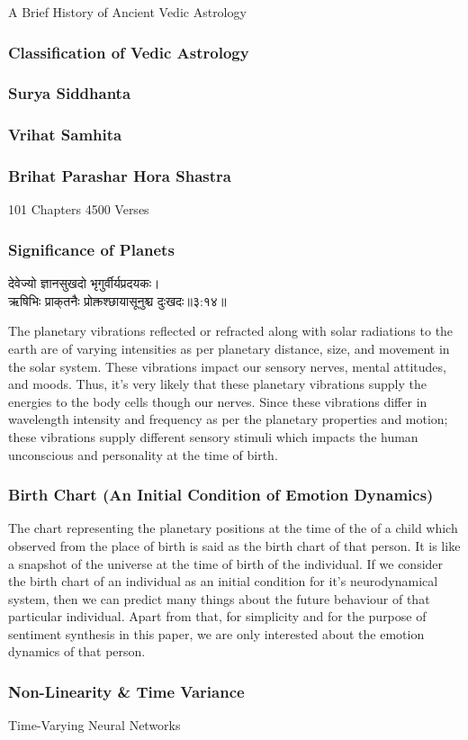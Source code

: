 A Brief History of Ancient Vedic Astrology
\subsubsection{Classification of Vedic Astrology}
\subsubsection{Surya Siddhanta}
\subsubsection{Vrihat Samhita}
\subsubsection{Brihat Parashar Hora Shastra}
101 Chapters
4500 Verses
\subsubsection{Significance of Planets}
\begin{sanskrit}
	\begin{center}
		देवेज्यो ज्ञानसुखदो भृगुर्वीर्यप्रदयकः।\\ऋषिभिः प्राक्‌तनैः प्रोक्तश्छायासूनुश्च दुःखदः॥३:१४॥\cite{BrihatParasharHoraShastraVol1}
	\end{center}
\end{sanskrit}
The planetary vibrations reflected or refracted along with solar radiations to the earth are of
varying intensities as per planetary distance, size, and movement in the solar system. These
vibrations impact our sensory nerves, mental attitudes, and moods. Thus, it’s very likely that
these planetary vibrations supply the energies to the body cells though our nerves. Since
these vibrations differ in wavelength intensity and frequency as per the planetary properties
and motion; these vibrations supply different sensory stimuli which impacts the human
unconscious and personality at the time of birth\cite{article}.
\subsubsection{Birth Chart (An Initial Condition of Emotion Dynamics)}
The chart representing the planetary positions at the time of the of a child which observed from the place of birth is said as the birth chart of that person. It is like a snapshot of the universe at the time of birth of the individual.
If we consider the birth chart of an individual as an initial condition for it's neurodynamical system, then we can predict many things about the future behaviour of that particular individual. Apart from that, for simplicity and for the purpose of sentiment synthesis in this paper, we are only interested about the emotion dynamics of that person.
\subsubsection{Non-Linearity \& Time Variance}
Time-Varying Neural Networks